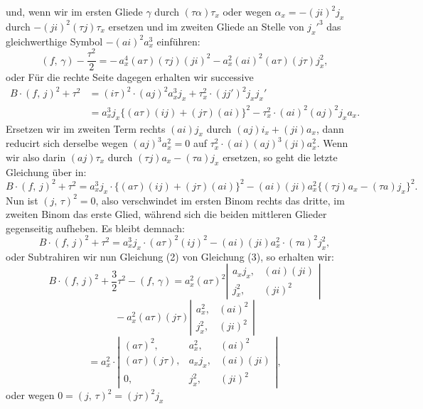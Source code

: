 und, wenn wir im ersten Gliede $\gamma$ durch $(\tau\alpha)\tau_x$ oder wegen $\alpha_x=-(ji)^2j_x$
durch $-(ji)^2(\tau j)\tau_x$ ersetzen und im zweiten Gliede an Stelle von $j_x'^3$
das gleichwerthige Symbol $-(ai)^2a_x^3$ einf\"uhren:
\[
(f,\,\gamma) - \frac{\tau^2}{2} = -\,a_x^4(a\tau)(\tau j)(ji)^2 - a_x^2(ai)^2(a\tau)(j\tau)j_x^2,
\]
oder
F\"ur die rechte Seite dagegen erhalten wir successive
\[
\begin{aligned}
B\cdot(f,\,j)^2+\tau^2 &= (i\tau)^2\cdot(aj)^2a_x^3j_x+\tau_x^2\cdot(jj')^2j_xj_x' \\
&= a_x^3j_x\{(a\tau)(ij)+(j\tau)(ai)\}^2-\tau_x^2\cdot(ai)^2(aj)^2j_xa_x.
\end{aligned}
\]
Ersetzen wir im zweiten Term rechts $(ai)j_x$ durch $(aj)i_x+(ji)a_x$,
dann reducirt sich derselbe wegen $(aj)^3a_x^2=0$ auf $\tau_x^2\cdot(ai)(aj)^3(ji)a_x^2$.
Wenn wir also darin $(aj)\tau_x$ durch $(\tau j)a_x-(\tau a)j_x$ ersetzen, so geht
die letzte Gleichung \"uber in:
\[
B\cdot(f,\,j)^2+\tau^2 = a_x^3j_x\cdot\{(a\tau)(ij)+(j\tau)(ai)\}^2 - (ai)(ji)a_x^2\{(\tau j)a_x-(\tau a)j_x\}^2.
\]
Nun ist $(j,\,\tau)^2=0$, also verschwindet im ersten Binom rechts
das dritte, im zweiten Binom das erste Glied, w\"ahrend sich die beiden
mittleren Glieder gegenseitig aufheben. Es bleibt demnach:
\[
B\cdot(f,\,j)^2+\tau^2 = a_x^3j_x\cdot(a\tau)^2(ij)^2 - (ai)(ji)a_x^2\cdot(\tau a)^2j_x^2,
\]
oder
Subtrahiren wir nun Gleichung (2) von Gleichung (3), so erhalten
 wir:
\[
B\cdot(f,\,j)^2 + \frac{3}{2}\tau^2 - (f,\,\gamma) = a_x^2(a\tau)^2\left|\begin{array}{cc} a_xj_x, & (ai)(ji) \\ j_x^2, & (ji)^2 \end{array}\right|
\]
\[
{}- a_x^2(a\tau)(j\tau)\left|\begin{array}{cc} a_x^2, & (ai)^2 \\ j_x^2, & (ji)^2 \end{array}\right|
\]
\[
= a_x^2\cdot\left|\begin{array}{ccc} (a\tau)^2, & a_x^2, & (ai)^2 \\ (a\tau)(j\tau), & a_xj_x, & (ai)(ji) \\ 0, & j_x^2, & (ji)^2 \end{array}\right|,
\]
oder wegen $0=(j,\,\tau)^2=(j\tau)^2j_x$


